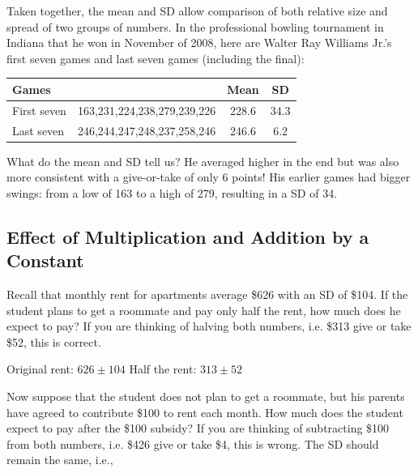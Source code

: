 \documentclass[11pt, chapterprefix=true]{scrbook}\usepackage[]{graphicx}\usepackage[]{color}
\begin{document}
Taken together, the mean and SD allow comparison of both relative size and spread of two groups of numbers.  In the professional bowling tournament in Indiana that he won in November of 2008, here are Walter Ray Williams Jr.'s first seven  games and last seven games (including the final):

\begin{table}[htbp]
   \centering

   \begin{tabular}{@{} | lccc | @{}} \hline
      Games &  & Mean & SD \\ \hline
      First seven & 163,231,224,238,279,239,226 & 228.6 & 34.3 \\
      Last seven  & 246,244,247,248,237,258,246 & 246.6 & 6.2 \\ \hline
   \end{tabular}

\end{table}

What do the mean and SD tell us?  He averaged higher in the end but was also more consistent with a give-or-take of only 6 points!  His earlier games had bigger swings: from a low of 163 to a high of 279, resulting in a SD of 34.

\subsection{Effect of Multiplication and Addition by a Constant}

Recall that monthly rent for apartments average \$626 with an SD of \$104.  If the student plans to get a roommate and pay only half the rent, how much does he expect to pay?  If you are thinking of halving both numbers, i.e. \$313 give or take \$52, this is correct.

\begin{center}
Original rent: $ 626 \pm 104 $ \hspace{2cm}	Half the rent: $ 313 \pm 52 $
\end{center}

Now suppose that the student does not plan to get a roommate, but his parents have agreed to contribute \$100 to rent each month.  How much does the student expect to pay after the \$100 subsidy? If you are thinking of subtracting \$100 from both numbers, i.e. \$426 give or take \$4, this is wrong.  The SD should remain the same, i.e.,
\end{document}
